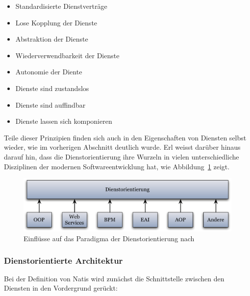   \begin{itemize}
    \item Standardisierte Dienstverträge
    \item Lose Kopplung der Dienste
    \item Abstraktion der Dienste
    \item Wiederverwendbarkeit der Dienste
    \item Autonomie der Diente
    \item Dienste sind zustandslos
    \item Dienste sind auffindbar
    \item Dienste lassen sich komponieren
  \end{itemize}
  
  Teile dieser Prinzipien finden sich auch in den Eigenschaften von Diensten selbst wieder, wie im vorherigen Abschnitt deutlich wurde. Erl weisst darüber hinaus darauf hin, dass die Dienstorientierung ihre Wurzeln in vielen unterschiedliche Disziplinen der modernen Softwareentwicklung hat, wie Abbildung~\ref{fig:images_Wurzeln_Dienstorientierung} zeigt.
  
  
\begin{figure}[ht]
  \centering
    \includegraphics[width=.9\textwidth]{images/Wurzeln_Dienstorientierung.pdf}
  \caption{Einflüsse auf das Paradigma der Dienstorientierung nach \citep{erl2008soa}}
  \label{fig:images_Wurzeln_Dienstorientierung}
\end{figure}


\pagebreak

\subsubsection{Dienstorientierte Architektur} %
\label{ssub:definition_dienstorientierte_architektur}

  Bei der Definition von Natis wird zunächst die Schnittstelle zwischen den Diensten in den Vordergrund gerückt:

